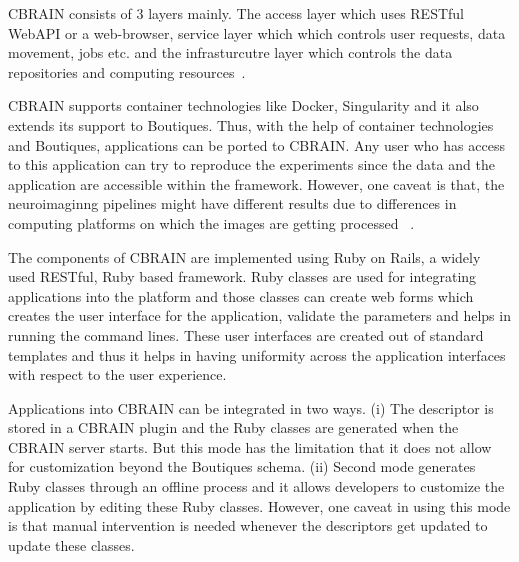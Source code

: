 
CBRAIN consists of 3 layers mainly. The access layer which uses RESTful WebAPI or a web-browser, service layer which which controls user requests, data movement, jobs etc. and the infrasturcutre layer which controls the data repositories and computing resources~\cite{DBLP:journals/fini/DasGRSPMSRSKMKR17}.

CBRAIN supports container technologies like Docker, Singularity and it 
also extends its support to Boutiques. Thus, with the help of container 
technologies and Boutiques, applications can be ported to CBRAIN. Any 
user who has access to this application can try to reproduce the 
experiments since the data and the application are accessible within 
the framework. However, one caveat is that, the neuroimaginng pipelines 
might have different results due to differences in computing platforms 
on which the images are getting processed 
~\cite{10.3389/conf.fninf.2014.18.00076}.

The components of CBRAIN are implemented using Ruby on Rails, a widely 
used RESTful, Ruby based framework. Ruby classes are used for 
integrating applications into the platform and those classes can create 
web forms which creates the user interface for the application, 
validate the parameters and helps in running the command lines. These 
user interfaces are created out of standard templates and thus it helps 
in having uniformity across the application interfaces with respect to 
the user experience.

Applications into CBRAIN can be integrated in two ways. (i) The 
descriptor is stored in a CBRAIN plugin and the Ruby classes are 
generated when the CBRAIN server starts. But this mode has the 
limitation that it does not allow for customization beyond the 
Boutiques schema. (ii) Second mode generates Ruby classes through an 
offline process and it allows developers to customize the application 
by editing these Ruby classes. However, one caveat in using this mode 
is that manual intervention is needed whenever the descriptors get 
updated to update these classes.

